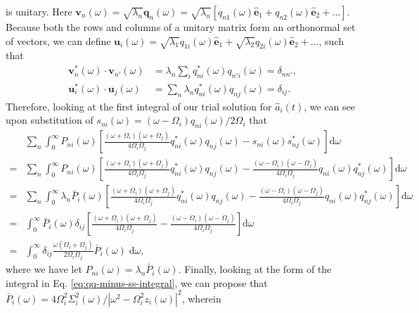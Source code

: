 is unitary. Here $\mathbf{v}_n(\omega) = \sqrt{\lambda_n}\mathbf{q}_n(\omega) = \sqrt{\lambda_n}\left[q_{n1}(\omega)\hat{\mathbf{e}}_1 + q_{n2}(\omega)\hat{\mathbf{e}}_2 + \ldots\right]$. Because both the rows and columns of a unitary matrix form an orthonormal set of vectors, we can define $\mathbf{u}_i(\omega) = \sqrt{\lambda_1}q_{1i}(\omega)\hat{\mathbf{e}}_{1} + \sqrt{\lambda_{2}}q_{2i}(\omega)\hat{\mathbf{e}}_{2} + \ldots$, such that
\begin{equation}
\begin{split}
\mathbf{v}_n^*(\omega)\cdot\mathbf{v}_{n'}(\omega) &= \lambda_n\sum_iq_{ni}^*(\omega)q_{n'i}(\omega) = \delta_{nn'},\\
\mathbf{u}_i^*(\omega)\cdot\mathbf{u}_j(\omega) &= \sum_n\lambda_nq_{ni}^*(\omega)q_{nj}(\omega) = \delta_{ij}.
\end{split}
\end{equation}
Therefore, looking at the first integral of our trial solution for $\hat{a}_i(t)$, we can see upon substitution of $s_{ni}(\omega) = (\omega - \Omega_i)q_{ni}(\omega)/2\Omega_i$ that
\begin{equation}
\begin{split}
&\sum_n\int_0^\infty P_{ni}(\omega)\left[\frac{(\omega + \Omega_i)(\omega + \Omega_j)}{4\Omega_i\Omega_j}q_{ni}^*(\omega)q_{nj}(\omega) - s_{ni}(\omega)s_{nj}^*(\omega)\right]\mathrm{d}\omega\\
= &\sum_n\int_0^\infty P_{ni}(\omega)\left[\frac{(\omega + \Omega_i)(\omega + \Omega_j)}{4\Omega_i\Omega_j}q_{ni}^*(\omega)q_{nj}(\omega) - \frac{(\omega - \Omega_i)(\omega - \Omega_j)}{4\Omega_i\Omega_j}q_{ni}(\omega)q_{nj}^*(\omega)\right]\mathrm{d}\omega\\
= &\sum_n\int_0^\infty\lambda_n\bar{P}_{i}(\omega)\left[\frac{(\omega + \Omega_i)(\omega + \Omega_j)}{4\Omega_i\Omega_j}q_{ni}^*(\omega)q_{nj}(\omega) - \frac{(\omega - \Omega_i)(\omega - \Omega_j)}{4\Omega_i\Omega_j}q_{ni}(\omega)q_{nj}^*(\omega)\right]\mathrm{d}\omega\\
= &\int_0^\infty\bar{P}_{i}(\omega)\delta_{ij}\left[\frac{(\omega + \Omega_i)(\omega + \Omega_j)}{4\Omega_i\Omega_j} - \frac{(\omega - \Omega_i)(\omega - \Omega_j)}{4\Omega_i\Omega_j}\right]\mathrm{d}\omega\\
= &\int_0^\infty\delta_{ij}\frac{\omega(\Omega_i + \Omega_j)}{2\Omega_i\Omega_j}\bar{P}_i(\omega)\;\mathrm{d}\omega,
\end{split}
\end{equation}
where we have let $P_{ni}(\omega) = \lambda_n\bar{P}_i(\omega)$. Finally, looking at the form of the integral in Eq. \eqref{eq:qq-minus-ss-integral}, we can propose that $\bar{P}_{i}(\omega) = 4\Omega_i^2 \Sigma_i^2(\omega)/|\omega^2 - \Omega_i^2z_i(\omega)|^2$, wherein
